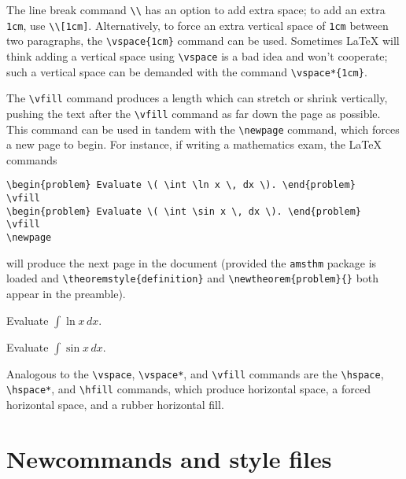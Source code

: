 \documentclass[11pt]{article}
\begin{document}
The line break command \verb~\\~ has an option to add extra space; to add an 
extra \verb~1cm~, use \verb~\\[1cm]~.  Alternatively, to force an extra vertical space 
of \verb~1cm~ between two paragraphs, the \verb~\vspace{1cm}~ command can be used.  
Sometimes \LaTeX{} will think adding a vertical space using \verb~\vspace~ is a bad 
idea and won't cooperate; such a vertical space can be demanded with the 
command \verb~\vspace*{1cm}~.

The \verb~\vfill~ command produces a length which can stretch or shrink vertically, 
pushing the text after the \verb~\vfill~ command as far down the page as possible.  
This command can be used in tandem with the \verb~\newpage~ command, which forces a 
new page to begin.  For instance, if writing a mathematics exam, the \LaTeX{} commands
\begin{verbatim}
\begin{problem} Evaluate \( \int \ln x \, dx \). \end{problem}
\vfill
\begin{problem} Evaluate \( \int \sin x \, dx \). \end{problem}
\vfill
\newpage
\end{verbatim}
will produce the next page in the document (provided the \verb~amsthm~ package is 
loaded and \verb~\theoremstyle{definition}~ and \verb~\newtheorem{problem}{}~ both 
appear in the preamble).

\newpage

\begin{problem} Evaluate \( \int \ln x \, dx \). \end{problem}
\vfill
\begin{problem} Evaluate \( \int \sin x \, dx \). \end{problem}
\vfill

\newpage

Analogous to the \verb~\vspace~, \verb~\vspace*~, and \verb~\vfill~ commands are the 
\verb~\hspace~, \verb~\hspace*~, and \verb~\hfill~ commands, which produce horizontal 
space, a forced horizontal space, and a rubber horizontal fill.  

\section{Newcommands and style files}
\end{document}
